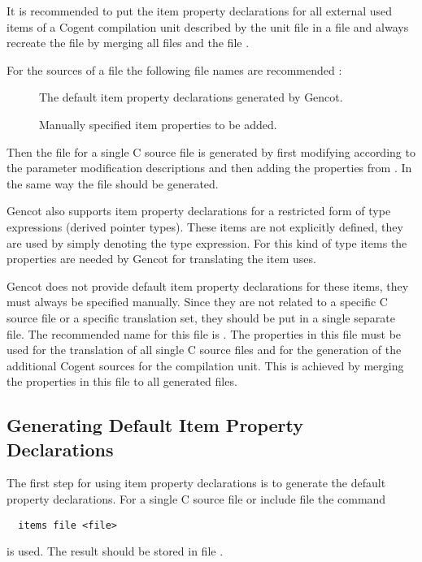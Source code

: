 It is recommended to put the item property declarations for all external used items of a Cogent compilation unit described by
the unit file  in a file  and always recreate the file  by merging all
files  and the file .

For the sources of a file  the following file names are recommended :
\begin{description}
\item[] The default item property declarations generated by Gencot.
\item[] Manually specified item properties to be added. 
\end{description}
Then the file  for a single C source file is generated by first modifying  
according to the parameter modification descriptions and then adding the properties from . In the same
way the file  should be generated.

Gencot also supports item property declarations for a restricted form of type expressions (derived pointer types). These items
are not explicitly defined, they are used by simply denoting the type expression. For this kind of type items the properties are 
needed by Gencot for translating the item uses. 

Gencot does not provide default item property declarations for these items, they must always be specified manually. Since they 
are not related to a specific C source file or a specific translation set, they should be put in a single separate file. The 
recommended name for this file is . The properties in this file must be used for the translation 
of all single C source files and for the generation of the additional Cogent sources for the compilation unit. This is 
achieved by merging the properties in this file to all generated  files.

\subsection{Generating Default Item Property Declarations}
\label{app-items-default}

The first step for using item property declarations is to generate the default property declarations. For a single C source 
file or include file  the command
\begin{verbatim}
  items file <file>
\end{verbatim}
is used. The result should be stored in file .

